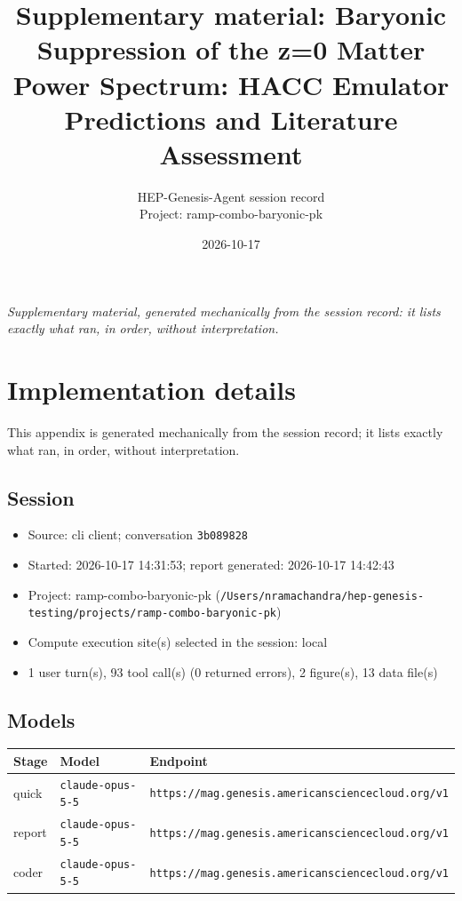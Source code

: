 \documentclass[11pt,a4paper]{article}
\title{Supplementary material: Baryonic Suppression of the z=0 Matter Power Spectrum: HACC Emulator Predictions and Literature Assessment}
\author{HEP-Genesis-Agent session record \\ \small Project: ramp-combo-baryonic-pk}
\date{2026-10-17}
\begin{document}
\maketitle
\noindent\textit{\small Supplementary material, generated mechanically from the session record: it lists exactly what ran, in order, without interpretation.}
\vspace{1em}



\appendix
\section{Implementation details}
\label{app:impl}
This appendix is generated mechanically from the session record; it lists exactly what ran, in order, without interpretation.
\subsection{Session}
\begin{itemize}
  \item Source: cli client; conversation \texttt{3b089828}
  \item Started: 2026-10-17 14:31:53; report generated: 2026-10-17 14:42:43
  \item Project: ramp-combo-baryonic-pk (\texttt{/\allowbreak{}Users/\allowbreak{}nramachandra/\allowbreak{}hep-genesis-testing/\allowbreak{}projects/\allowbreak{}ramp-combo-baryonic-pk})
  \item Compute execution site(s) selected in the session: local
  \item 1 user turn(s), 93 tool call(s) (0 returned errors), 2 figure(s), 13 data file(s)
\end{itemize}
\subsection{Models}
\begin{longtable}{@{}p{}p{}p{}@{}}
\toprule Stage & Model & Endpoint \\ \midrule \endhead
quick & \texttt{claude-opus-5-5} & \texttt{https:\allowbreak{}/\allowbreak{}/\allowbreak{}mag.genesis.americansciencecloud.org/\allowbreak{}v1} \\
report & \texttt{claude-opus-5-5} & \texttt{https:\allowbreak{}/\allowbreak{}/\allowbreak{}mag.genesis.americansciencecloud.org/\allowbreak{}v1} \\
coder & \texttt{claude-opus-5-5} & \texttt{https:\allowbreak{}/\allowbreak{}/\allowbreak{}mag.genesis.americansciencecloud.org/\allowbreak{}v1} \\
\bottomrule\end{longtable}
\end{document}
